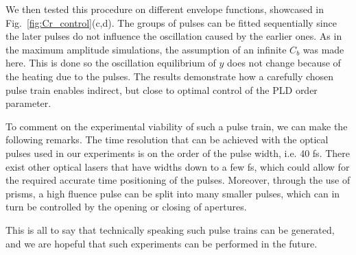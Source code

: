 We then tested this procedure on different envelope functions, showcased in Fig.~\ref{fig:Cr_control}(c,d).
The groups of pulses can be fitted sequentially since the later pulses do not influence the oscillation caused by the earlier ones.
As in the maximum amplitude simulations, the assumption of an infinite $C_b$ was made here.
This is done so the oscillation equilibrium of $y$ does not change because of the heating due to the pulses.
The results demonstrate how a carefully chosen pulse train enables indirect, but close to optimal control of the PLD order parameter.

To comment on the experimental viability of such a pulse train, we can make the following remarks.
The time resolution that can be achieved with the optical pulses used in our experiments is on the order of the pulse width, i.e. 40 fs. There exist other optical lasers that have widths down to a few fs, which could allow for the required accurate time positioning of the pulses.
Moreover, through the use of prisms, a high fluence pulse can be split into many smaller pulses, which can in turn be controlled by the opening or closing of apertures.

This is all to say that technically speaking such pulse trains can be generated, and we are hopeful that such experiments can be performed in the future.

